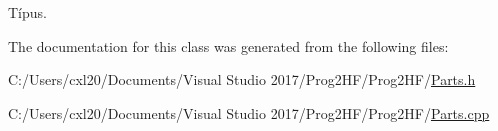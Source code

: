 Típus. 



The documentation for this class was generated from the following files\+:\begin{DoxyCompactItemize}
\item 
C\+:/\+Users/cxl20/\+Documents/\+Visual Studio 2017/\+Prog2\+H\+F/\+Prog2\+H\+F/\mbox{\hyperlink{_parts_8h}{Parts.\+h}}\item 
C\+:/\+Users/cxl20/\+Documents/\+Visual Studio 2017/\+Prog2\+H\+F/\+Prog2\+H\+F/\mbox{\hyperlink{_parts_8cpp}{Parts.\+cpp}}\end{DoxyCompactItemize}
